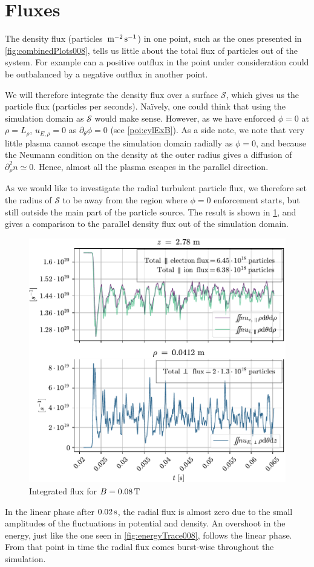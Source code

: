 \section{Fluxes}
\label{sec:fluxes}
%
The density flux (particles $\, \text{m}^{-2}\, \text{s}^{-1}$) in one point, such as the ones presented in \cref{fig:combinedPlots008}, tells us little about the total flux of particles out of the system.
For example can a positive outflux in the point under consideration could be outbalanced by a negative outflux in another point.

We will therefore integrate the density flux over a surface $\mathcal{S}$, which gives us the particle flux (particles per seconds).
Na{\"i}vely, one could think that using the simulation domain as $\mathcal{S}$ would make sense.
However, as we have enforced $\phi=0$ at $\rho=L_\rho$, $u_{E,\rho}=0$ as $\partial_\theta \phi=0$ (see \cref{poi:cylExB}).
As a side note, we note that very little plasma cannot escape the simulation domain radially as $\phi=0$, and because the Neumann condition on the density at the outer radius gives a diffusion of $\partial_\rho^2 n \simeq 0$.
Hence, almost all the plasma escapes in the parallel direction.

As we would like to investigate the radial turbulent particle flux, we therefore set the radius of $\mathcal{S}$ to be away from the region where $\phi=0$ enforcement starts, but still outside the main part of the particle source.
The result is shown in \cref{fig:flux0008}, and gives a comparison to the parallel density flux out of the simulation domain.
%
\begin{figure}[htb]
    \centering
    \includegraphics{fig/results/totalFlux/flux0008}
    \caption{Integrated flux for $B=0.08\, \text{T}$}
    \label{fig:flux0008}
\end{figure}
%
In the linear phase after $0.02\, \text{s}$, the radial flux is almost zero due to the small amplitudes of the fluctuations in potential and density.
An overshoot in the energy, just like the one seen in \cref{fig:energyTrace008}, follows the linear phase.
From that point in time the radial flux comes burst-wise throughout the simulation.

